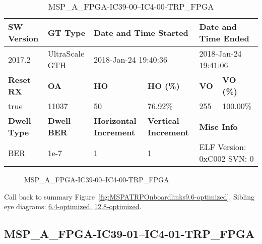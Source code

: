 \begin{table}[h]
\centering
\caption{MSP\_A\_FPGA-IC39-00--IC4-00-TRP\_FPGA}
\label{tab:MSPAFPGAIC3900IC400TRPFPGA9.6-optimized}
\begin{tabular}{@{}|l|l|l|l|l|l|@{}}
\toprule
\textbf{SW Version}                & \textbf{GT Type}   & \multicolumn{2}{l|}{\textbf{Date and Time Started}}            & \multicolumn{2}{l|}{\textbf{Date and Time Ended}}        \\ \midrule
2017.2                       & UltraScale GTH          & \multicolumn{2}{l|}{2018-Jan-24 19:40:36}                   & \multicolumn{2}{l|}{2018-Jan-24 19:41:06}               \\ \midrule
\textbf{Reset RX}                  & \textbf{OA} & \textbf{HO}   & \textbf{HO (\%)} & \textbf{VO} & \textbf{VO (\%)} \\ \midrule
true & 11037        & 50          & 76.92\%        & 255        & 100.00\%       \\ \midrule
\textbf{Dwell Type}                & \textbf{Dwell BER} & \textbf{Horizontal Increment} & \textbf{Vertical Increment}    & \multicolumn{2}{l|}{\textbf{Misc Info}}                  \\ \midrule
BER                            & 1e-7        & 1        & 1           & \multicolumn{2}{l|}{ELF Version: 0xC002 SVN: 0}                         \\ \bottomrule
\end{tabular}
\end{table}

\begin{figure}[h]
\caption{MSP\_A\_FPGA-IC39-00--IC4-00-TRP\_FPGA} \label{fig:MSPAFPGAIC3900IC400TRPFPGA9.6-optimized}
\end{figure}

Call back to summary Figure~\ref{fig:MSPATRPOnboardlinks9.6-optimized}.
Sibling eye diagrams: \hyperref[sec:MSPAFPGAIC3900IC400TRPFPGA6.4-optimized]{6.4-optimized}, \hyperref[sec:MSPAFPGAIC3900IC400TRPFPGA12.8-optimized]{12.8-optimized}.

\clearpage
\newpage


\subsection{MSP\_A\_FPGA-IC39-01--IC4-01-TRP\_FPGA}\label{sec:MSPAFPGAIC3901IC401TRPFPGA9.6-optimized}

